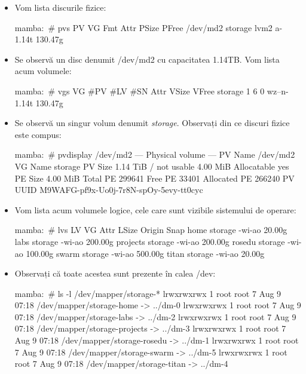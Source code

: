 \begin{itemize}
	\item Vom lista discurile fizice:

\begin{screen}
mamba:~# pvs
  PV         VG      Fmt  Attr PSize PFree
  /dev/md2   storage lvm2 a-   1.14t 130.47g
\end{screen}

	\item Se observă un disc denumit /dev/md2 cu capacitatea 1.14TB. Vom
		lista acum volumele:

\begin{screen}
mamba:~# vgs
  VG      #PV #LV #SN Attr   VSize VFree
  storage   1   6   0 wz--n- 1.14t 130.47g
\end{screen}

	\item Se observă un singur volum denumit \textit{storage}. Observați din
		ce discuri fizice este compus:

\begin{screen}
mamba:~# pvdisplay /dev/md2
  --- Physical volume ---
  PV Name               /dev/md2
  VG Name               storage
  PV Size               1.14 TiB / not usable 4.00 MiB
  Allocatable           yes
  PE Size               4.00 MiB
  Total PE              299641
  Free PE               33401
  Allocated PE          266240
  PV UUID               M9WAFG-pf9x-Uo0j-7r8N-spOy-5evy-tt0cyc
\end{screen}

	\item Vom lista acum volumele logice, cele care sunt vizibile sistemului
		de operare:

\begin{screen}
mamba:~# lvs
  LV       VG      Attr   LSize   Origin Snap%
  home     storage -wi-ao  20.00g
  labs     storage -wi-ao 200.00g
  projects storage -wi-ao 200.00g
  rosedu   storage -wi-ao 100.00g
  swarm    storage -wi-ao 500.00g
  titan    storage -wi-ao  20.00g
\end{screen}


	\item Observați că toate acestea sunt prezente în calea /dev:

\begin{screen}
mamba:~# ls -l /dev/mapper/storage-*
lrwxrwxrwx 1 root root 7 Aug  9 07:18 /dev/mapper/storage-home -> ../dm-0
lrwxrwxrwx 1 root root 7 Aug  9 07:18 /dev/mapper/storage-labs -> ../dm-2
lrwxrwxrwx 1 root root 7 Aug  9 07:18 /dev/mapper/storage-projects -> ../dm-3
lrwxrwxrwx 1 root root 7 Aug  9 07:18 /dev/mapper/storage-rosedu -> ../dm-1
lrwxrwxrwx 1 root root 7 Aug  9 07:18 /dev/mapper/storage-swarm -> ../dm-5
lrwxrwxrwx 1 root root 7 Aug  9 07:18 /dev/mapper/storage-titan -> ../dm-4
\end{screen}

\end{itemize}

